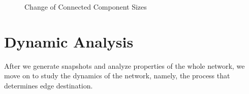 \documentclass[10pt]{article}
\begin{document}
\begin{multicols}{2}
\begin{figure}[H]
\caption{Change of Connected Component Sizes \label{fig:cc}}
\end{figure}

\section{Dynamic Analysis}
\vspace{10pt}

After we generate snapshots and analyze properties of the whole network, we move on to study the dynamics of the network, namely, the process that determines edge destination.


\end{multicols}
\end{document}
